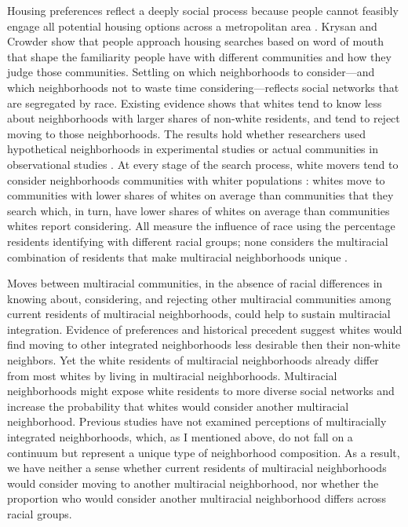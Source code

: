 \documentclass{baderart}
\begin{document}
Housing preferences reflect a deeply social process because people cannot feasibly engage all potential housing options across a metropolitan area \citep{brown_intra-urban_1970, maclennan_housing_1982, marsh_uncertainty_2011}. Krysan and Crowder \citeyearpar{krysan_cycle_2017} show that people approach housing searches based on word of mouth that shape the familiarity people have with different communities and how they judge those communities. Settling on which neighborhoods to consider---and which neighborhoods not to waste time considering---reflects social networks that are segregated by race. Existing evidence shows that whites tend to know less about neighborhoods with larger shares of non-white residents, and tend to reject moving to those neighborhoods. The results hold whether researchers used hypothetical neighborhoods in experimental studies or actual communities in observational studies \citep{charles_neighborhood_2000, krysan_perceiving_2007, krysan_does_2009, lewis_who_2011, bader_community_2015}. At every stage of the search process, white movers tend to consider neighborhoods communities with whiter populations \citep{havekes_realizing_2016}: whites move to communities with lower shares of whites on average than communities that they search which, in turn, have lower shares of whites on average than communities whites report considering. All measure the influence of race using the percentage residents identifying with different racial groups; none considers the multiracial combination of residents that make multiracial neighborhoods unique \citep[for exception, see ][]{krysan_diversity_2017}.

Moves between multiracial communities, in the absence of racial differences in knowing about, considering, and rejecting other multiracial communities among current residents of multiracial neighborhoods, could help to sustain multiracial integration. Evidence of preferences and historical precedent suggest whites would find moving to other integrated neighborhoods less desirable then their non-white neighbors. Yet the white residents of multiracial neighborhoods already differ from most whites by living in multiracial neighborhoods. Multiracial neighborhoods might expose white residents to more diverse social networks and increase the probability that whites would consider another multiracial neighborhood. Previous studies have not examined perceptions of multiracially integrated neighborhoods, which, as I mentioned above, do not fall on a continuum but represent a unique type of neighborhood composition. As a result, we have neither a sense whether current residents of multiracial neighborhoods would consider moving to another multiracial neighborhood, nor whether the proportion who would consider another multiracial neighborhood differs across racial groups.
\end{document}
